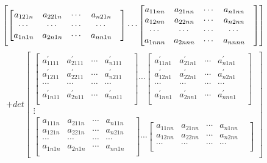 \documentclass[twoside,a4paper,CCT]{cctart}   %
\begin{document}
\begin{define}
\begin{list}{}
$$\begin{bmatrix}
\begin{bmatrix}
  a_{121n}& a_{221n}&\cdots&a_{n21n}\\
  \cdots&\cdots&\cdots &\cdots& \\
   a_{1n1n}& a_{2n1n}&\cdots&a_{nn1n}\\
   \end{bmatrix}
\cdots
\begin{bmatrix}
  a_{11nn}& a_{21nn}&\cdots&a_{n1nn}\\
  a_{12nn}& a_{22nn}&\cdots&a_{n2nn}\\
  \cdots&\cdots&\cdots &\cdots& \\
   a_{1nnn}& a_{2nnn}&\cdots&a_{nnnn}\\
   \end{bmatrix}
    \end{bmatrix}
  \\$$
  $$+det
  \begin{bmatrix}
 \begin{bmatrix}
   a_{1111}^{'}& a_{2111}^{'}&\cdots&a_{n111}^{'}\\
   a_{1211}^{'}& a_{2211}^{'}&\cdots&a_{n211}^{'}\\
  \cdots&\cdots&\cdots &\cdots& \\
a_{1n11}^{'}& a_{2n11}^{'}&\cdots&a_{nn11}^{'}\\
\end{bmatrix}
\cdots
\begin{bmatrix}
  a_{11n1}^{'}& a_{21n1}^{'}&\cdots&a_{n1n1}^{'}\\
  a_{12n1}^{'}& a_{22n1}^{'}&\cdots&a_{n2n1}^{'}\\
  \cdots&\cdots&\cdots &\cdots& \\
 a_{1nn1}^{'}& a_{2nn1}^{'}&\cdots&a_{nnn1}^{'}\\
 \end{bmatrix}\\
\vdots\\
\begin{bmatrix}
  a_{111n}& a_{211n}&\cdots&a_{n11n}\\
  a_{121n}& a_{221n}&\cdots&a_{n21n}\\
  \cdots&\cdots&\cdots &\cdots& \\
   a_{1n1n}& a_{2n1n}&\cdots&a_{nn1n}\\
   \end{bmatrix}
\cdots
\begin{bmatrix}
  a_{11nn}& a_{21nn}&\cdots&a_{n1nn}\\
  a_{12nn}& a_{22nn}&\cdots&a_{n2nn}\\
  \cdots&\cdots&\cdots &\cdots& \\

\end{bmatrix}
\end{bmatrix}$$
\end{list}
\end{define}
\end{document}
